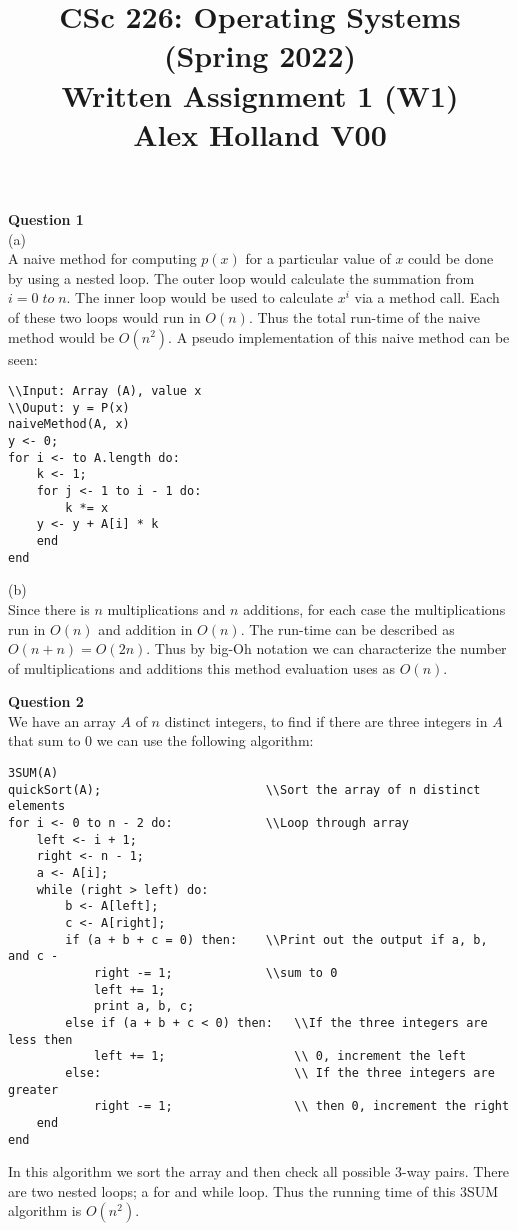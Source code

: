 \documentclass{article}
\title{%
   CSc 226: Operating Systems (Spring 2022) \\
   \large Written Assignment 1 (W1) \\
    Alex Holland V00}
\date{}
\begin{document}
\maketitle

{\bf Question 1}\\
(a)\\
A naive method for computing $p(x)$ for a particular value of $x$ could be done by using a nested loop. The outer loop would calculate the summation from $i=0 \; to \; n$. The inner loop would be used to calculate $x^i$ via a method call. Each of these two loops would run in $O(n)$. Thus the total run-time of the naive method would be $O(n^2)$. A pseudo implementation of this naive method can be seen:
\begin{lstlisting}
\\Input: Array (A), value x
\\Ouput: y = P(x)
naiveMethod(A, x)
y <- 0;
for i <- to A.length do:
    k <- 1;
    for j <- 1 to i - 1 do:
        k *= x
    y <- y + A[i] * k
    end
end
\end{lstlisting}

\smallskip
(b)\\
Since there is $n$ multiplications and $n$ additions, for each case the multiplications run in $O(n)$ and addition in $O(n)$. The run-time can be described as $O(n+n)=O(2n)$. Thus by big-Oh notation we can characterize the number of multiplications and additions this method evaluation uses as $O(n)$.

\bigskip
{\bf Question 2}\\
We have an array $A$ of $n$ distinct integers, to find if there are three integers in $A$ that sum to $0$ we can use the following algorithm:
\begin{lstlisting}
3SUM(A)
quickSort(A);                       \\Sort the array of n distinct elements
for i <- 0 to n - 2 do:             \\Loop through array                      
    left <- i + 1;
    right <- n - 1;
    a <- A[i];
    while (right > left) do:
        b <- A[left];
        c <- A[right];
        if (a + b + c = 0) then:    \\Print out the output if a, b, and c -
            right -= 1;             \\sum to 0
            left += 1;
            print a, b, c;          
        else if (a + b + c < 0) then:   \\If the three integers are less then
            left += 1;                  \\ 0, increment the left
        else:                           \\ If the three integers are greater
            right -= 1;                 \\ then 0, increment the right
    end
end
\end{lstlisting}
In this algorithm we sort the array and then check all possible 3-way pairs. There are two nested loops; a for and while loop. Thus the running time of this 3SUM algorithm is $O(n^2)$.
\end{document}
